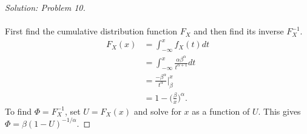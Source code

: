 \documentclass[10pt]{article}
\begin{document}
\vspace{0.2cm}
\begin{proof}[Solution: Problem 10]
\text{}\\
\text{}\\
First find the cumulative distribution function $F_X$ and then find its inverse $F_X^{-1}$.
\begin{align*}
F_X(x) &= \int_{-\infty}^x f_X(t) dt\\
&= \int_{-\infty}^x \frac{\alpha \beta^\alpha}{t^{\alpha+1}} dt\\
&= \frac{- \beta^\alpha}{t^{\alpha}} \bigg|_{\beta}^{x}\\
&= 1 - \bigg(\frac{\beta}{x}\bigg)^\alpha.
\end{align*}
To find $\Phi = F_X^{-1}$, set $U = F_X(x)$ and solve for $x$ as a function of $U$. This gives $\Phi = \beta(1- U)^{-1/\alpha}$.
\end{proof}
\end{document}
